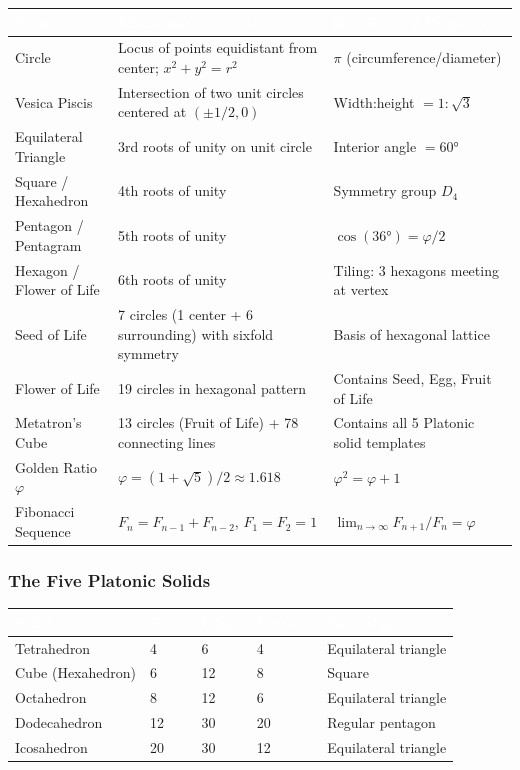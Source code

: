 \documentclass[11pt,letterpaper]{article}
\newcommand{\tableheader}[1]{\textbf{\sffamily\textcolor{white}{#1}}}
\begin{document}
\begin{center}
\begin{tabularx}{\textwidth}{L{3.2cm}XL{3.5cm}}
\toprule
{}
\tableheader{Form} & \tableheader{Mathematical Structure} & \tableheader{Key Ratio / Property} \\
\midrule
Circle & Locus of points equidistant from center; $x^2+y^2=r^2$ & $\pi$ (circumference/diameter) \\
Vesica Piscis & Intersection of two unit circles centered at $(\pm 1/2, 0)$ & Width:height $= 1:\sqrt{3}$ \\
Equilateral Triangle & 3rd roots of unity on unit circle & Interior angle $= 60°$ \\
Square / Hexahedron & 4th roots of unity & Symmetry group $D_4$ \\
Pentagon / Pentagram & 5th roots of unity & $\cos(36°) = \varphi/2$ \\
Hexagon / Flower of Life & 6th roots of unity & Tiling: 3 hexagons meeting at vertex \\
Seed of Life & 7 circles (1 center + 6 surrounding) with sixfold symmetry & Basis of hexagonal lattice \\
Flower of Life & 19 circles in hexagonal pattern & Contains Seed, Egg, Fruit of Life \\
Metatron's Cube & 13 circles (Fruit of Life) + 78 connecting lines & Contains all 5 Platonic solid templates \\
Golden Ratio $\varphi$ & $\varphi = (1+\sqrt{5})/2 \approx 1.618$ & $\varphi^2 = \varphi + 1$ \\
Fibonacci Sequence & $F_n = F_{n-1}+F_{n-2}$, $F_1=F_2=1$ & $\lim_{n\to\infty}F_{n+1}/F_n = \varphi$ \\
\bottomrule
\end{tabularx}
\end{center}

\subsubsection{The Five Platonic Solids}

\begin{center}
\begin{tabularx}{\textwidth}{L{2.8cm}C{1.8cm}C{1.8cm}C{1.8cm}L{3cm}}
\toprule
{}
\tableheader{Solid} & \tableheader{Faces} & \tableheader{Edges} & \tableheader{Vertices} & \tableheader{Face Shape} \\
\midrule
Tetrahedron & 4 & 6 & 4 & Equilateral triangle \\
Cube (Hexahedron) & 6 & 12 & 8 & Square \\
Octahedron & 8 & 12 & 6 & Equilateral triangle \\
Dodecahedron & 12 & 30 & 20 & Regular pentagon \\
Icosahedron & 20 & 30 & 12 & Equilateral triangle \\
\bottomrule
\end{tabularx}
\end{center}
\end{document}
